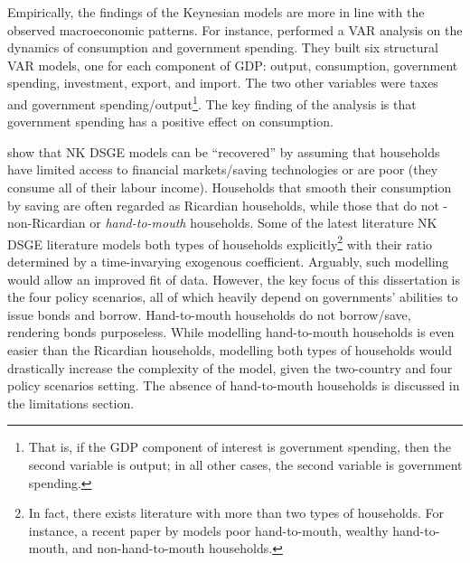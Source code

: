 Empirically, the findings of the Keynesian models are more in line with the observed macroeconomic patterns. For instance, \textcite{blanchard_2002_an} performed a VAR analysis on the dynamics of consumption and government spending. They built six structural VAR models, one for each component of GDP: output, consumption, government spending, investment, export, and import. The two other variables were taxes and government spending/output\footnote{That is, if the GDP component of interest is government spending, then the second variable is output; in all other cases, the second variable is government spending.}. The key finding of the analysis is that government spending has a positive effect on consumption. 

\textcite{jordigal_2005_understanding} show that NK DSGE models can be ``recovered'' by assuming that households have limited access to financial markets/saving technologies or are poor (they consume all of their labour income). Households that smooth their consumption by saving are often regarded as Ricardian households, while those that do not - non-Ricardian or \textit{hand-to-mouth} households. Some of the latest literature NK DSGE literature models both types of households explicitly\footnote{In fact, there exists literature with more than two types of households. For instance, a recent paper by \textcite{eskelinen_2021_monetary} models poor hand-to-mouth, wealthy hand-to-mouth, and non-hand-to-mouth households.} with their ratio determined by a time-invarying exogenous coefficient. Arguably, such modelling would allow an improved fit of data. However, the key focus of this dissertation is the four policy scenarios, all of which heavily depend on governments' abilities to issue bonds and borrow. Hand-to-mouth households do not borrow/save, rendering bonds purposeless. While modelling hand-to-mouth households is even easier than the Ricardian households, modelling both types of households would drastically increase the complexity of the model, given the two-country and four policy scenarios setting. The absence of hand-to-mouth households is discussed in the limitations section.